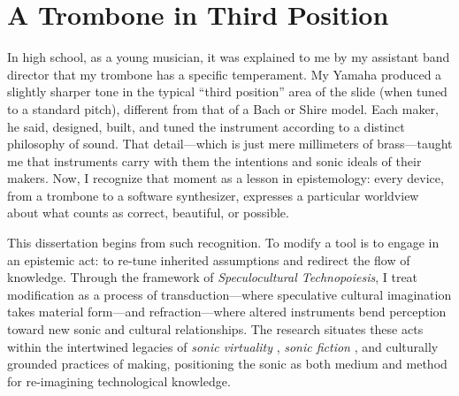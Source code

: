 %
%

\section*{A Trombone in Third Position}

In high school, as a young musician, it was explained to me by my assistant band director that my trombone has a specific temperament. My Yamaha produced a slightly sharper tone in the typical ``third position'' area of the slide (when tuned to a standard pitch), different from that of a Bach or Shire model. Each maker, he said, designed, built, and tuned the instrument according to a distinct philosophy of sound. That detail---which is just mere millimeters of brass---taught me that instruments carry with them the intentions and sonic ideals of their makers. Now, I recognize that moment as a lesson in epistemology: every device, from a trombone to a software synthesizer, expresses a particular worldview about what counts as correct, beautiful, or possible.

This dissertation begins from such recognition. To modify a tool is to engage in an epistemic act: to re-tune inherited assumptions and redirect the flow of knowledge. Through the framework of \textit{Speculocultural Technopoiesis}, I treat modification as a process of transduction---where speculative cultural imagination takes material form---and refraction---where altered instruments bend perception toward new sonic and cultural relationships. The research situates these acts within the intertwined legacies of \textit{sonic virtuality} \parencite{Grimshaw_Garner_2015}, \textit{sonic fiction} \parencite{Eshun_1999}, and culturally grounded practices of making, positioning the sonic as both medium and method for re-imagining technological knowledge.

